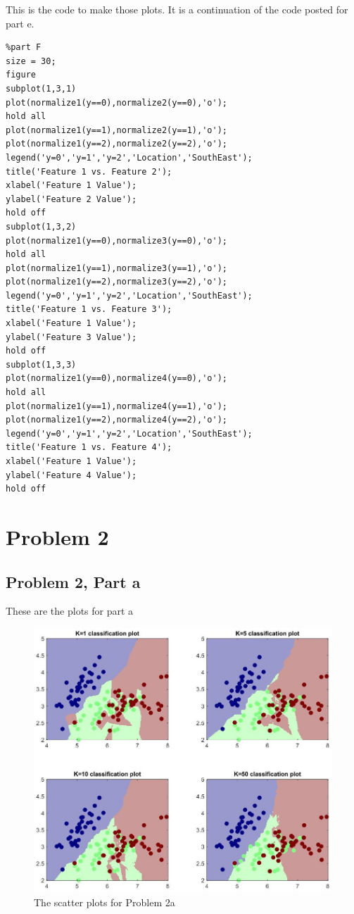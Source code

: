 \documentclass[11pt,psfig]{article}
\begin{document}
This is the code to make those plots. It is a continuation of the code posted for part e. 
\begin{verbatim}
%part F
size = 30;
figure
subplot(1,3,1)
plot(normalize1(y==0),normalize2(y==0),'o');
hold all
plot(normalize1(y==1),normalize2(y==1),'o');
plot(normalize1(y==2),normalize2(y==2),'o');
legend('y=0','y=1','y=2','Location','SouthEast');
title('Feature 1 vs. Feature 2');
xlabel('Feature 1 Value');
ylabel('Feature 2 Value');
hold off
subplot(1,3,2)
plot(normalize1(y==0),normalize3(y==0),'o');
hold all
plot(normalize1(y==1),normalize3(y==1),'o');
plot(normalize1(y==2),normalize3(y==2),'o');
legend('y=0','y=1','y=2','Location','SouthEast');
title('Feature 1 vs. Feature 3');
xlabel('Feature 1 Value');
ylabel('Feature 3 Value');
hold off
subplot(1,3,3)
plot(normalize1(y==0),normalize4(y==0),'o');
hold all
plot(normalize1(y==1),normalize4(y==1),'o');
plot(normalize1(y==2),normalize4(y==2),'o');
legend('y=0','y=1','y=2','Location','SouthEast');
title('Feature 1 vs. Feature 4');
xlabel('Feature 1 Value');
ylabel('Feature 4 Value');
hold off
\end{verbatim}

\newpage

\section*{Problem 2}

\subsection*{Problem 2, Part a}

These are the plots for part a

\begin{figure}[H]
\centering
\includegraphics[width=\columnwidth]{prob2aPlots.jpg}
\caption{The scatter plots for Problem 2a}
\end{figure}
\end{document}
